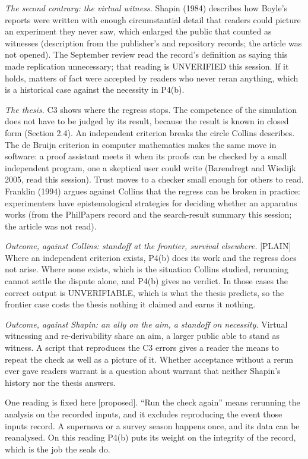 \documentclass[11pt]{article}
\newcommand{\register}[1]{{\ttfamily\small #1}}
\begin{document}
\emph{The second contrary: the virtual witness.} Shapin (1984) describes how Boyle's reports were written with enough circumstantial detail that readers could picture an experiment they never saw, which enlarged the public that counted as witnesses (description from the publisher's and repository records; the article was not opened). The September review read the record's definition as saying this made replication unnecessary; that reading is UNVERIFIED this session. If it holds, matters of fact were accepted by readers who never reran anything, which is a historical case against the necessity in P4(b).

\emph{The thesis.} C3 shows where the regress stops. The competence of the simulation does not have to be judged by its result, because the result is known in closed form (Section 2.4). An independent criterion breaks the circle Collins describes. The de Bruijn criterion in computer mathematics makes the same move in software: a proof assistant meets it when its proofs can be checked by a small independent program, one a skeptical user could write (Barendregt and Wiedijk 2005, read this session). Trust moves to a checker small enough for others to read. Franklin (1994) argues against Collins that the regress can be broken in practice: experimenters have epistemological strategies for deciding whether an apparatus works (from the PhilPapers record and the search-result summary this session; the article was not read).

\emph{Outcome, against Collins: standoff at the frontier, survival elsewhere.} \register{[PLAIN]} Where an independent criterion exists, P4(b) does its work and the regress does not arise. Where none exists, which is the situation Collins studied, rerunning cannot settle the dispute alone, and P4(b) gives no verdict. In those cases the correct output is UNVERIFIABLE, which is what the thesis predicts, so the frontier case costs the thesis nothing it claimed and earns it nothing.

\emph{Outcome, against Shapin: an ally on the aim, a standoff on necessity.} Virtual witnessing and re-derivability share an aim, a larger public able to stand as witness. A script that reproduces the C3 errors gives a reader the means to repeat the check as well as a picture of it. Whether acceptance without a rerun ever gave readers warrant is a question about warrant that neither Shapin's history nor the thesis answers.

One reading is fixed here [proposed]. ``Run the check again'' means rerunning the analysis on the recorded inputs, and it excludes reproducing the event those inputs record. A supernova or a survey season happens once, and its data can be reanalysed. On this reading P4(b) puts its weight on the integrity of the record, which is the job the seals do.
\end{document}
